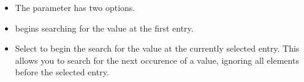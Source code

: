 % 
\begin{itemize}
\item The  parameter has two options. 
\item  {} begins searching for the value at the first entry.
\item Select  to begin the search for the value at the currently selected entry. This allows you to search for the next occurence of a value, ignoring all elements before the selected entry. 
\end{itemize}
